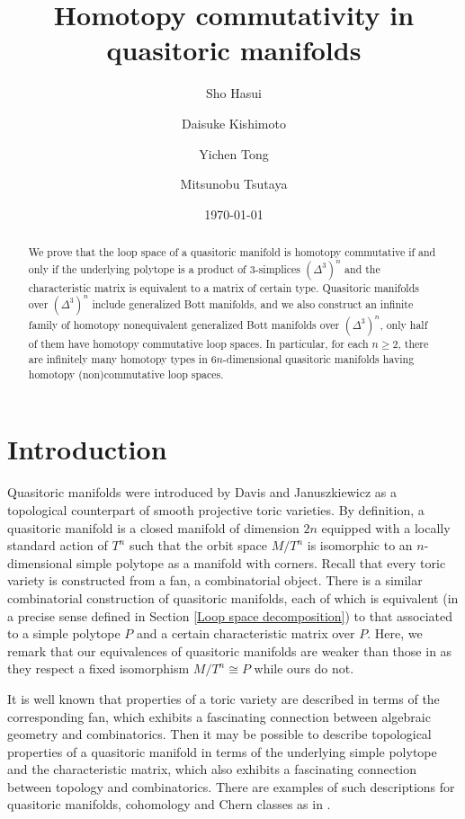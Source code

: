 \documentclass[a4paper]{amsart}
\title[Homotopy commutativity in quasitoric manifolds]{Homotopy commutativity in quasitoric manifolds}
\author[S. Hasui]{Sho Hasui}
\author[D. Kishimoto]{Daisuke Kishimoto}
\author[Y. Tong]{Yichen Tong}
\author[M. Tsutaya]{Mitsunobu Tsutaya}
\date{\today}
\numberwithin{equation}{section}
\theoremstyle{definition}
\theoremstyle{remark}
\numberwithin{equation}{section}
\begin{document}
\maketitle

\begin{abstract}
  We prove that the loop space of a quasitoric manifold is homotopy commutative if and only if the underlying polytope is a product of $3$-simplices $(\Delta^3)^n$ and the characteristic matrix is equivalent to a matrix of certain type. Quasitoric manifolds over $(\Delta^3)^n$ include generalized Bott manifolds, and we also construct an infinite family of homotopy nonequivalent generalized Bott manifolds over $(\Delta^3)^n$, only half of them have homotopy commutative loop spaces. In particular, for each $n\ge 2$, there are infinitely many homotopy types in $6n$-dimensional quasitoric manifolds having homotopy (non)commutative loop spaces.
\end{abstract}




\section{Introduction}\label{Introduction}

Quasitoric manifolds were introduced by Davis and Januszkiewicz \cite{DJ} as a topological counterpart of smooth projective toric varieties. By definition, a quasitoric manifold is a closed manifold of dimension $2n$ equipped with a locally standard action of $T^n$ such that the orbit space $M/T^n$ is isomorphic to an $n$-dimensional simple polytope as a manifold with corners. Recall that every toric variety is constructed from a fan, a combinatorial object. There is a similar combinatorial construction of quasitoric manifolds, each of which is equivalent (in a precise sense defined in Section \ref{Loop space decomposition}) to that associated to a simple polytope $P$ and a certain characteristic matrix over $P$. Here, we remark that our equivalences of quasitoric manifolds are weaker than those in \cite{DJ} as they respect a fixed isomorphism $M/T^n\cong P$ while ours do not. %



It is well known that properties of a toric variety are described in terms of the corresponding fan, which exhibits a fascinating connection between algebraic geometry and combinatorics. Then it may be possible to describe topological properties of a quasitoric manifold in terms of the underlying simple polytope and the characteristic matrix, which also exhibits a fascinating connection between topology and combinatorics. There are examples of such descriptions for quasitoric manifolds, cohomology and Chern classes as in \cite{DJ}.
\end{document}
